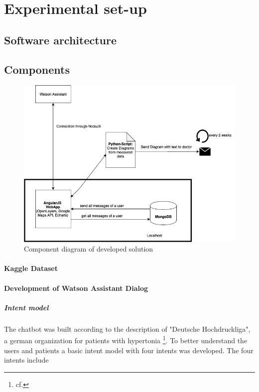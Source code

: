 \section{Experimental set-up}

\subsection{Software architecture}

\subsection{Components}
\begin{figure}[htbp]
	\centering
	\includegraphics[width=1\textwidth]{images/components.png}
	\caption{Component diagram of developed solution}
	\label{ncbi_query}
\end{figure}

\paragraph{Kaggle Dataset}
\paragraph{Development of Watson Assistant Dialog}

\subparagraph{Intent model}

The chatbot was built according to the description of "Deutsche Hochdruckliga", a german organization for patients with hypertonia \footnote{cf.\autocite{hochdruckliga}}.
To better understand the users and patients a basic intent model with four intents was developed. 
The four intents include 

